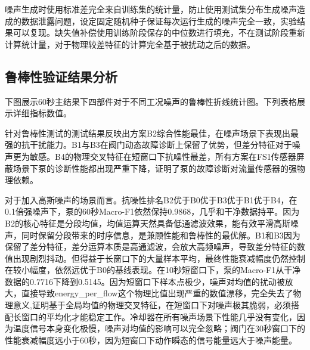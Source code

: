 \documentclass[12pt, a4paper]{ctexart}
\begin{document}
噪声生成时使用标准差完全来自训练集的统计量，防止使用测试集分布生成噪声造成的数据泄露问题，设定固定随机种子保证每次运行生成的噪声完全一致，实验结果可以复现。缺失值补偿使用训练阶段保存的中位数进行填充，不在测试阶段重新计算统计量，对于物理较差特征的计算完全基于被扰动之后的数据。
\subsection{鲁棒性验证结果分析}
下图展示60秒主结果下四部件对于不同工况噪声的鲁棒性折线统计图。下列表格展示详细指标数值。

针对鲁棒性测试的测试结果反映出方案B2综合性能最佳，在噪声场景下表现出最强的抗干扰能力。B1与B3在阀门动态故障诊断上保留了优势，但差分特征对于噪声更为敏感。B4的物理交叉特征在短窗口下抗噪性最差，所有方案在FS1传感器屏蔽场景下泵的诊断性能都出现严重下降，证明了泵的故障诊断对流量传感器的强物理依赖。

对于加入高斯噪声的场景而言。抗噪性排名B2优于B0优于B3优于B1优于B4，在0.1倍强噪声下，泵的60秒Macro-F1依然保持0.9868，几乎和干净数据持平。因为B2的核心特征是分段均值，均值运算天然具备低通滤波效果，能有效平滑高斯噪声，同时保留分段带来的时序信息，是兼顾性能和鲁棒性的最优解。B1和B3因为保留了差分特征，差分运算本质是高通滤波，会放大高频噪声，导致差分特征的数值出现剧烈抖动。但得益于长窗口下的大量样本平均，最终性能衰减幅度仍然控制在较小幅度，依然远优于B0的基线表现。在10秒短窗口下，泵的Macro-F1从干净数据的0.7716下降到0.5145。因为短窗口下样本点极少，噪声对均值的扰动被放大，直接导致energy\_per\_flow这个物理比值出现严重的数值漂移，完全失去了物理意义,证明基于全局均值的物理交叉特征，在短窗口下对噪声极其脆弱，必须搭配长窗口的平均化才能稳定工作‌。冷却器在所有噪声场景下性能几乎没有变化，因为温度信号本身变化极慢，噪声对均值的影响可以完全忽略；阀门在30秒窗口下的性能衰减幅度远小于60秒，因为短窗口下动作瞬态的信号能量远大于噪声能量。
\end{document}
